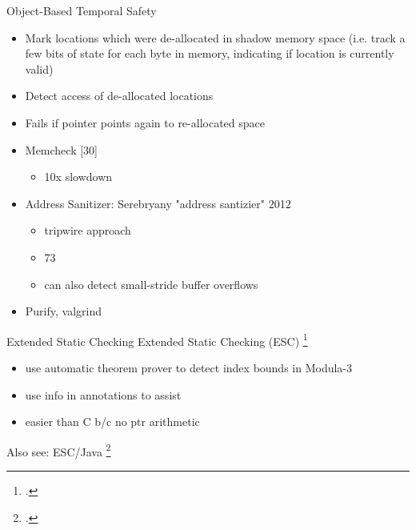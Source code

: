 \documentclass[aspectratio=169]{beamer}
\begin{document}
\begin{frame}{Object-Based Temporal Safety}
\begin{itemize}
\item Mark locations which were de-allocated in shadow memory space (i.e. track a few bits of state for each byte in memory, indicating if location is currently valid)
\item Detect access of de-allocated locations
\item Fails if pointer points again to re-allocated space
\item Memcheck [30] 
    \begin{itemize}
      \item 10x slowdown
    \end{itemize}
\item Address Sanitizer: Serebryany "address santizier" 2012
    \begin{itemize}
        \item tripwire approach
        \item 73%
        \item can also detect small-stride buffer overflows
    \end{itemize}
\item Purify, valgrind
\end{itemize}
\end{frame}

\begin{frame}[fragile]{Extended Static Checking}
Extended Static Checking (ESC) \footcite{detlefs_overview_1995}
    \begin{itemize}
      \item use automatic theorem prover to detect index bounds in Modula-3
      \item use info in annotations to assist
      \item easier than C b/c no ptr arithmetic
    \end{itemize}
Also see: ESC/Java \footcite{flanagan_extended_2002}
\end{frame}
\end{document}
